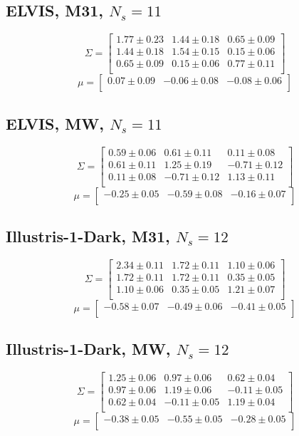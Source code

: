\documentclass[a4paper,fleqn,usenatbib]{mnras}
\begin{document}
\subsection{ELVIS, M31, $N_s=11$}
\[
\Sigma=
\begin{bmatrix}
1.77 \pm 0.23 & 1.44 \pm 0.18 & 0.65 \pm 0.09\\
1.44 \pm 0.18 & 1.54 \pm 0.15 & 0.15 \pm 0.06\\
0.65 \pm 0.09 & 0.15 \pm 0.06 & 0.77 \pm 0.11\\
\end{bmatrix}
\]
\[
\mu=
\begin{bmatrix}
0.07 \pm 0.09 & -0.06 \pm 0.08 & -0.08 \pm 0.06\\
\end{bmatrix}
\]
\subsection{ELVIS, MW, $N_s=11$}
\[
\Sigma=
\begin{bmatrix}
0.59 \pm 0.06 & 0.61 \pm 0.11 & 0.11 \pm 0.08\\
0.61 \pm 0.11 & 1.25 \pm 0.19 & -0.71 \pm 0.12\\
0.11 \pm 0.08 & -0.71 \pm 0.12 & 1.13 \pm 0.11\\
\end{bmatrix}
\]
\[
\mu=
\begin{bmatrix}
-0.25 \pm 0.05 & -0.59 \pm 0.08 & -0.16 \pm 0.07\\
\end{bmatrix}
\]

\subsection{Illustris-1-Dark, M31, $N_s=12$}
\[
\Sigma=
\begin{bmatrix}
2.34 \pm 0.11 & 1.72 \pm 0.11 & 1.10 \pm 0.06\\
1.72 \pm 0.11 & 1.72 \pm 0.11 & 0.35 \pm 0.05\\
1.10 \pm 0.06 & 0.35 \pm 0.05 & 1.21 \pm 0.07\\
\end{bmatrix}
\]
\[
\mu=
\begin{bmatrix}
-0.58 \pm 0.07 & -0.49 \pm 0.06 & -0.41 \pm 0.05\\
\end{bmatrix}
\]
\subsection{Illustris-1-Dark, MW, $N_s=12$}
\[
\Sigma=
\begin{bmatrix}
1.25 \pm 0.06 & 0.97 \pm 0.06 & 0.62 \pm 0.04\\
0.97 \pm 0.06 & 1.19 \pm 0.06 & -0.11 \pm 0.05\\
0.62 \pm 0.04 & -0.11 \pm 0.05 & 1.19 \pm 0.04\\
\end{bmatrix}
\]
\[
\mu=
\begin{bmatrix}
-0.38 \pm 0.05 & -0.55 \pm 0.05 & -0.28 \pm 0.05\\
\end{bmatrix}
\]
\end{document}
